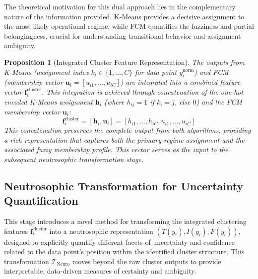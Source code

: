 \documentclass[review,3p,times]{elsarticle}
\newtheorem{proposition}[definition]{Proposition}
\begin{document}
The theoretical motivation for this dual approach lies in the complementary nature of the information provided. K-Means provides a decisive assignment to the most likely operational regime, while FCM quantifies the fuzziness and partial belongingness, crucial for understanding transitional behavior and assignment ambiguity.

\begin{proposition}[Integrated Cluster Feature Representation]
\label{prop:integrated_cluster_features}
The outputs from K-Means (assignment index $k_i \in \{1, \dots, C\}$ for data point $y_i^{\text{norm}}$) and FCM (membership vector $\mathbf{u}_i = [u_{i1}, \dots, u_{iC}]$) are integrated into a combined feature vector $\mathbf{f}_i^{\text{cluster}}$. This integration is achieved through concatenation of the one-hot encoded K-Means assignment $\mathbf{h}_i$ (where $h_{ij}=1$ if $k_i=j$, else $0$) and the FCM membership vector $\mathbf{u}_i$:
\begin{equation}
    \mathbf{f}_i^{\text{cluster}} = [\mathbf{h}_i, \mathbf{u}_i] = [h_{i1}, \dots, h_{iC}, u_{i1}, \dots, u_{iC}]
\end{equation}
This concatenation preserves the complete output from both algorithms, providing a rich representation that captures both the primary regime assignment and the associated fuzzy membership profile. This vector serves as the input to the subsequent neutrosophic transformation stage.
\end{proposition}

\subsection{Neutrosophic Transformation for Uncertainty Quantification}
\label{sec:neutrosophic_transform}

This stage introduces a novel method for transforming the integrated clustering features $\mathbf{f}_i^{\text{cluster}}$ into a neutrosophic representation $(T(y_i), I(y_i), F(y_i))$, designed to explicitly quantify different facets of uncertainty and confidence related to the data point's position within the identified cluster structure. This transformation $\mathcal{T}_{\text{Neuro}}$ moves beyond the raw cluster outputs to provide interpretable, data-driven measures of certainty and ambiguity.
\end{document}
